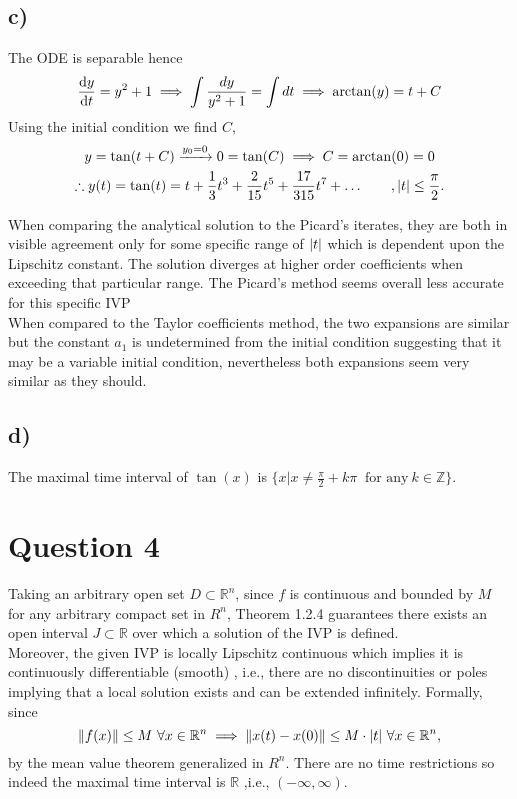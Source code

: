 \documentclass[
	12pt,
	]{article}
\newcommand{\R}{\mathbb{R}}
\DeclarePairedDelimiter{\norm}{\lVert}{\rVert}
\theoremstyle{definition}
\theoremstyle{definition}
\theoremstyle{definition}
\theoremstyle{definition}
\theoremstyle{definition}
\theoremstyle{example}
\theoremstyle{note}
\theoremstyle{remark}
\theoremstyle{example}
\begin{document}
			\subsection*{c) }
				The ODE is separable hence
				\begin{gather*}
					\dv{y}{t} = y^{2} +1 \implies \int \frac{dy}{y^{2}+1} = \int dt \implies \arctan (y) = t + C
				\end{gather*}
				Using the initial condition we find $C$, 
				\begin{gather*}
					y = \tan (t +C) \xrightarrow{y_{0} = 0} 0 = \tan(C) \implies C = \arctan(0) = 0 \\
					\therefore y(t) = \tan(t) = t + \frac{1}{3}t^{3} + \frac{2}{15} t^{5} + \frac{17}{315} t^{7}+ \dots  \qquad ,\abs{t} \le \frac{\pi}{2}.
				\end{gather*}
				
				\noindent When comparing the analytical solution to the Picard's iterates, they are both in visible agreement only for some specific range of $\abs{t}$ which is dependent upon the Lipschitz constant. The solution diverges at higher order coefficients when exceeding that particular range. The Picard's method seems overall less accurate for this specific IVP\\
				
				\noindent When compared to the Taylor coefficients method, the two expansions are similar but the constant $a_{1}$ is undetermined from the initial condition suggesting that it may be a variable initial condition, nevertheless both expansions seem very similar as they should.
				
				\subsection*{d) }
				 The maximal time interval of $\tan(x)$ is $\{x|x\neq \frac{\pi}{2} + k\pi \ \text{ for any} \ k \in \mathbb{Z}\}.$
				 
			\section*{Question 4}
					Taking an arbitrary open set $D\subset \R^{n}$, since $f$ is continuous and bounded by $M$ for any arbitrary compact set in $R^{n}$, Theorem 1.2.4 guarantees there exists an open  interval $J\subset \R$ over which a solution of the IVP is defined. \\
					
					\noindent Moreover, the given IVP is locally Lipschitz continuous which implies it is continuously differentiable (smooth) , i.e., there are no discontinuities or poles implying that a local solution exists and can be extended infinitely. Formally, since 
					$$ \norm{f(x)} \le M \ \forall x \in \R^{n} \implies \norm{x(t) - x(0)} \le M\cdot \abs{t} \ \forall x \in \R^{n},$$
					by the mean value theorem generalized in $R^{n}$. There are no time restrictions so indeed the maximal time interval is $\R$ ,i.e., $(-\infty, \infty)$.
\end{document}
